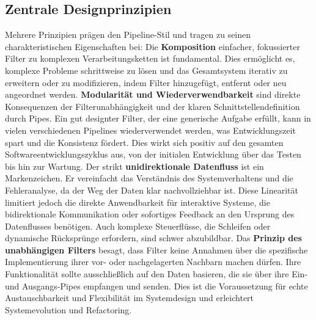 \documentclass[10pt]{article}
\begin{document}
\begin{multicols}{2}
\subsection{Zentrale Designprinzipien}
Mehrere Prinzipien prägen den Pipeline-Stil und tragen zu seinen charakteristischen Eigenschaften bei:
Die \textbf{Komposition} einfacher, fokussierter Filter zu komplexen Verarbeitungsketten ist fundamental.\cite{richards2020} Dies ermöglicht es, komplexe Probleme schrittweise zu lösen und das Gesamtsystem iterativ zu erweitern oder zu modifizieren, indem Filter hinzugefügt, entfernt oder neu angeordnet werden.
\textbf{Modularität und Wiederverwendbarkeit} sind direkte Konsequenzen der Filterunabhängigkeit und der klaren Schnittstellendefinition durch Pipes. Ein gut designter Filter, der eine generische Aufgabe erfüllt, kann in vielen verschiedenen Pipelines wiederverwendet werden, was Entwicklungszeit spart und die Konsistenz fördert. Dies wirkt sich positiv auf den gesamten Softwareentwicklungszyklus aus, von der initialen Entwicklung über das Testen bis hin zur Wartung.
Der strikt \textbf{unidirektionale Datenfluss}\cite{uqcloud_pipeline} ist ein Markenzeichen. Er vereinfacht das Verständnis des Systemverhaltens und die Fehleranalyse, da der Weg der Daten klar nachvollziehbar ist. Diese Linearität limitiert jedoch die direkte Anwendbarkeit für interaktive Systeme, die bidirektionale Kommunikation oder sofortiges Feedback an den Ursprung des Datenflusses benötigen. Auch komplexe Steuerflüsse, die Schleifen oder dynamische Rücksprünge erfordern, sind schwer abzubildbar.\cite{richards2020}
Das \textbf{Prinzip des unabhängigen Filters}\cite{uqcloud_pipeline} besagt, dass Filter keine Annahmen über die spezifische Implementierung ihrer vor- oder nachgelagerten Nachbarn machen dürfen. Ihre Funktionalität sollte ausschließlich auf den Daten basieren, die sie über ihre Ein- und Ausgangs-Pipes empfangen und senden. Dies ist die Voraussetzung für echte Austauschbarkeit und Flexibilität im Systemdesign und erleichtert Systemevolution und Refactoring.


\end{multicols}
\end{document}
